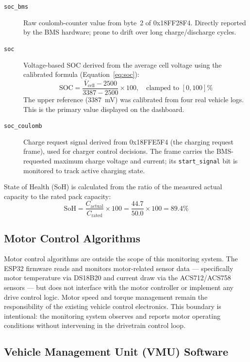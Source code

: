 \begin{description}
    \item[\texttt{soc\_bms}] Raw coulomb-counter value from byte~2 of 0x18FF28F4. Directly reported by the BMS hardware; prone to drift over long charge/discharge cycles.

    \item[\texttt{soc}] Voltage-based SOC derived from the average cell voltage using the calibrated formula (Equation~\ref{eq:soc}):
    \[
        \text{SOC} = \frac{\overline{V}_{\text{cell}} - 2500}{3387 - 2500} \times 100, \quad \text{clamped to } [0, 100]\%
    \]
    The upper reference (3387~mV) was calibrated from four real vehicle logs. This is the primary value displayed on the dashboard.

    \item[\texttt{soc\_coulomb}] Charge request signal derived from 0x18FFE5F4 (the charging request frame), used for charger control decisions. The frame carries the BMS-requested maximum charge voltage and current; its \texttt{start\_signal} bit is monitored to track active charging state.
\end{description}

State of Health (SoH) is calculated from the ratio of the measured actual capacity to the rated pack capacity:
\[
    \text{SoH} = \frac{C_{\text{actual}}}{C_{\text{rated}}} \times 100 = \frac{44.7}{50.0} \times 100 = 89.4\%
\]

\subsection{Motor Control Algorithms}

Motor control algorithms are outside the scope of this monitoring system. The ESP32 firmware reads and monitors motor-related sensor data --- specifically motor temperature via DS18B20 and current draw via the ACS712/ACS758 sensors --- but does not interface with the motor controller or implement any drive control logic. Motor speed and torque management remain the responsibility of the existing vehicle control electronics. This boundary is intentional: the monitoring system observes and reports motor operating conditions without intervening in the drivetrain control loop.

\subsection{Vehicle Management Unit (VMU) Software}


